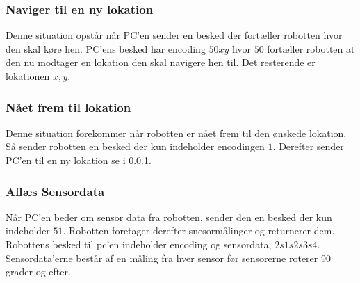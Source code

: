 \subsubsection{Naviger til en ny lokation}\label{design:protokol_navigertilny}
Denne situation opstår når PC'en sender en besked der fortæller robotten hvor den skal køre hen.
PC'ens besked har encoding $50xy$ hvor $50$ fortæller robotten at den nu modtager en lokation den skal navigere hen til.
Det resterende er lokationen $x,y$.

\subsubsection{Nået frem til lokation}
Denne situation forekommer når robotten er nået frem til den ønskede lokation.
Så sender robotten en besked der kun indeholder encodingen $1$.
Derefter sender PC'en til en ny lokation se i \cref{design:protokol_navigertilny}.

\subsubsection{Aflæs Sensordata}
Når PC'en beder om sensor data fra robotten, sender den en besked der kun indeholder $51$.
Robotten foretager derefter snesormålinger og returnerer dem.
Robottens besked til pc'en indeholder encoding og sensordata, $2s1s2s3s4$.
Sensordata'erne består af en måling fra hver sensor før sensorerne roterer 90 grader og efter.
